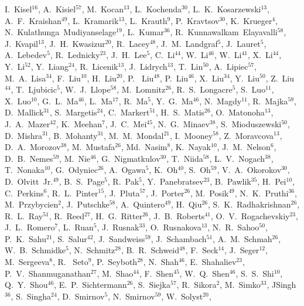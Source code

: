 \documentclass[%
 reprint,	
 amsmath,amssymb,
 aps,
 prc,
]{revtex4-1}
\begin{document}
{I.~Kisel$^{16}$,
A.~Kisiel$^{57}$,
M.~Kocan$^{13}$,
L.~Kochenda$^{30}$,
L.~K.~Kosarzewski$^{13}$,
A.~F.~Kraishan$^{49}$,
L.~Kramarik$^{13}$,
L.~Krauth$^{9}$,
P.~Kravtsov$^{30}$,
K.~Krueger$^{4}$,
N.~Kulathunga~Mudiyanselage$^{19}$,
L.~Kumar$^{36}$,
R.~Kunnawalkam~Elayavalli$^{58}$,
J.~Kvapil$^{13}$,
J.~H.~Kwasizur$^{20}$,
R.~Lacey$^{48}$,
J.~M.~Landgraf$^{5}$,
J.~Lauret$^{5}$,
A.~Lebedev$^{5}$,
R.~Lednicky$^{23}$,
J.~H.~Lee$^{5}$,
C.~Li$^{44}$,
W.~Li$^{46}$,
W.~Li$^{41}$,
X.~Li$^{44}$,
Y.~Li$^{52}$,
Y.~Liang$^{24}$,
R.~Licenik$^{13}$,
J.~Lidrych$^{13}$,
T.~Lin$^{50}$,
A.~Lipiec$^{57}$,
M.~A.~Lisa$^{34}$,
F.~Liu$^{10}$,
H.~Liu$^{20}$,
P.~ Liu$^{48}$,
P.~Liu$^{46}$,
X.~Liu$^{34}$,
Y.~Liu$^{50}$,
Z.~Liu$^{44}$,
T.~Ljubicic$^{5}$,
W.~J.~Llope$^{58}$,
M.~Lomnitz$^{26}$,
R.~S.~Longacre$^{5}$,
S.~Luo$^{11}$,
X.~Luo$^{10}$,
G.~L.~Ma$^{46}$,
L.~Ma$^{17}$,
R.~Ma$^{5}$,
Y.~G.~Ma$^{46}$,
N.~Magdy$^{11}$,
R.~Majka$^{59}$,
D.~Mallick$^{31}$,
S.~Margetis$^{24}$,
C.~Markert$^{51}$,
H.~S.~Matis$^{26}$,
O.~Matonoha$^{13}$,
J.~A.~Mazer$^{42}$,
K.~Meehan$^{7}$,
J.~C.~Mei$^{45}$,
N.~G.~Minaev$^{38}$,
S.~Mioduszewski$^{50}$,
D.~Mishra$^{31}$,
B.~Mohanty$^{31}$,
M.~M.~Mondal$^{21}$,
I.~Mooney$^{58}$,
Z.~Moravcova$^{13}$,
D.~A.~Morozov$^{38}$,
M.~Mustafa$^{26}$,
Md.~Nasim$^{8}$,
K.~Nayak$^{10}$,
J.~M.~Nelson$^{6}$,
D.~B.~Nemes$^{59}$,
M.~Nie$^{46}$,
G.~Nigmatkulov$^{30}$,
T.~Niida$^{58}$,
L.~V.~Nogach$^{38}$,
T.~Nonaka$^{10}$,
G.~Odyniec$^{26}$,
A.~Ogawa$^{5}$,
K.~Oh$^{40}$,
S.~Oh$^{59}$,
V.~A.~Okorokov$^{30}$,
D.~Olvitt~Jr.$^{49}$,
B.~S.~Page$^{5}$,
R.~Pak$^{5}$,
Y.~Panebratsev$^{23}$,
B.~Pawlik$^{35}$,
H.~Pei$^{10}$,
C.~Perkins$^{6}$,
R.~L.~Pinter$^{15}$,
J.~Pluta$^{57}$,
J.~Porter$^{26}$,
M.~Posik$^{49}$,
N.~K.~Pruthi$^{36}$,
M.~Przybycien$^{2}$,
J.~Putschke$^{58}$,
A.~Quintero$^{49}$,
H.~Qiu$^{26}$,
S.~K.~Radhakrishnan$^{26}$,
R.~L.~Ray$^{51}$,
R.~Reed$^{27}$,
H.~G.~Ritter$^{26}$,
J.~B.~Roberts$^{41}$,
O.~V.~Rogachevskiy$^{23}$,
J.~L.~Romero$^{7}$,
L.~Ruan$^{5}$,
J.~Rusnak$^{33}$,
O.~Rusnakova$^{13}$,
N.~R.~Sahoo$^{50}$,
P.~K.~Sahu$^{21}$,
S.~Salur$^{42}$,
J.~Sandweiss$^{59}$,
J.~Schambach$^{51}$,
A.~M.~Schmah$^{26}$,
W.~B.~Schmidke$^{5}$,
N.~Schmitz$^{28}$,
B.~R.~Schweid$^{48}$,
F.~Seck$^{14}$,
J.~Seger$^{12}$,
M.~Sergeeva$^{8}$,
R.~ Seto$^{9}$,
P.~Seyboth$^{28}$,
N.~Shah$^{46}$,
E.~Shahaliev$^{23}$,
P.~V.~Shanmuganathan$^{27}$,
M.~Shao$^{44}$,
F.~Shen$^{45}$,
W.~Q.~Shen$^{46}$,
S.~S.~Shi$^{10}$,
Q.~Y.~Shou$^{46}$,
E.~P.~Sichtermann$^{26}$,
S.~Siejka$^{57}$,
R.~Sikora$^{2}$,
M.~Simko$^{33}$,
JSingh$^{36}$,
S.~Singha$^{24}$,
D.~Smirnov$^{5}$,
N.~Smirnov$^{59}$,
W.~Solyst$^{20}$,
}
\end{document}
